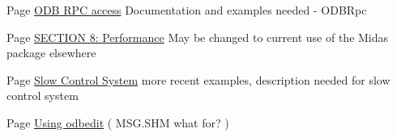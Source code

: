 \label{todo__todo000015}
\hypertarget{todo__todo000015}{}
 
\begin{DoxyDescription}
\item[Page \hyperlink{RC_mhttpd_custom_RPC_access}{ODB RPC access} ]Documentation and examples needed -\/ ODBRpc


\end{DoxyDescription}

\label{todo__todo000017}
\hypertarget{todo__todo000017}{}
 
\begin{DoxyDescription}
\item[Page \hyperlink{Performance}{SECTION 8: Performance} ]May be changed to current use of the Midas package elsewhere


\end{DoxyDescription}

\label{todo__todo000014}
\hypertarget{todo__todo000014}{}
 
\begin{DoxyDescription}
\item[Page \hyperlink{FE_Slow_Control_system}{Slow Control System} ]more recent examples, description needed for slow control system


\end{DoxyDescription}

\label{todo__todo000016}
\hypertarget{todo__todo000016}{}
 
\begin{DoxyDescription}
\item[Page \hyperlink{RC_odbedit_examples}{Using odbedit} ]( MSG.SHM what for? )


\end{DoxyDescription}